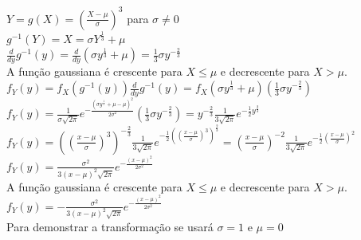 \documentclass{article}
\begin{document}
\begin{enumerate}
\begin{enumerate}
        $Y = g(X) = (\frac{X-\mu}{\sigma})^3$ para $\sigma \neq 0$\\

        $g^{-1}(Y) = X = \sigma Y^{\frac{1}{3}}+\mu$\\

        $\frac{d}{dy}g^{-1}(y) = \frac{d}{dy}(\sigma y^{\frac{1}{3}}+\mu) = \frac{1}{3}\sigma y^{-\frac{2}{3}}$\\

        A função gaussiana é crescente para $X \leq \mu$ e decrescente para $X > \mu$.\\

        $f_Y(y) = f_X(g^{-1}(y))\frac{d}{dy}g^{-1}(y) = f_X(\sigma y^{\frac{1}{3}}+\mu)(\frac{1}{3}\sigma y^{-\frac{2}{3}})$\\

        $f_Y(y) = \frac{1}{\sigma\sqrt{2\pi}}e^{-\frac{(\sigma y^{\frac{1}{3}}+\mu-\mu)^2}{2\sigma^2}}(\frac{1}{3}\sigma y^{-\frac{2}{3}}) = y^{-\frac{2}{3}}\frac{1}{3\sqrt{2\pi}}e^{-\frac{1}{2}y^{\frac{2}{3}}}$\\ 

        $f_Y(y) = ((\frac{x-\mu}{\sigma})^3)^{-\frac{2}{3}}\frac{1}{3\sqrt{2\pi}}e^{-\frac{1}{2}((\frac{x-\mu}{\sigma})^3)^{\frac{2}{3}}} = (\frac{x-\mu}{\sigma})^{-2}\frac{1}{3\sqrt{2\pi}}e^{-\frac{1}{2}(\frac{x-\mu}{\sigma})^{2}}$\\
         
        $f_Y(y) = \frac{\sigma^2}{3(x-\mu)^2\sqrt{2\pi}}e^{-\frac{(x-\mu)^{2}}{2\sigma^2}}$\\

        A função gaussiana é crescente para $X \leq \mu$ e decrescente para $X > \mu$.\\

        $f_Y(y) = -\frac{\sigma^2}{3(x-\mu)^2\sqrt{2\pi}}e^{-\frac{(x-\mu)^{2}}{2\sigma^2}}$\\
        
        Para demonstrar a transformação se usará $\sigma=1$ e $\mu=0$\\


\end{enumerate}
\end{enumerate}
\end{document}
